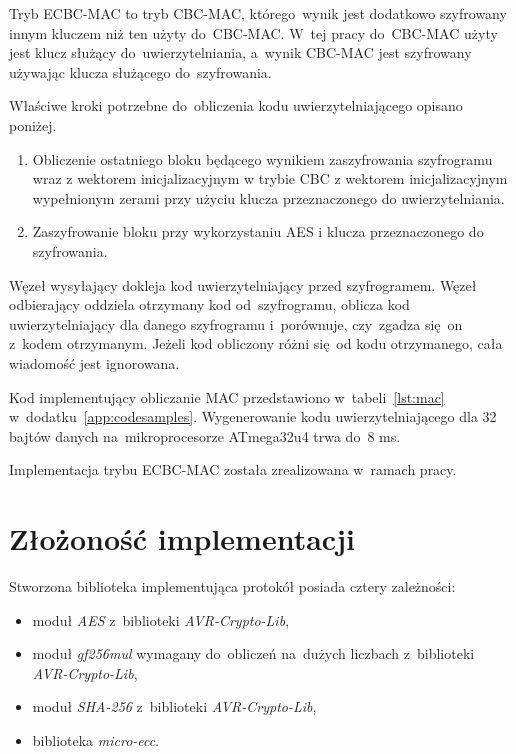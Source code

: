 Tryb ECBC-MAC to tryb CBC-MAC, którego~wynik jest dodatkowo szyfrowany innym kluczem niż ten użyty do~CBC-MAC. W~tej pracy do~CBC-MAC użyty jest klucz służący do~uwierzytelniania, a~wynik CBC-MAC jest szyfrowany używając klucza służącego do~szyfrowania.

Właściwe kroki potrzebne do~obliczenia kodu uwierzytelniającego opisano poniżej.

\begin{enumerate}
\item Obliczenie ostatniego bloku będącego wynikiem zaszyfrowania szyfrogramu wraz z wektorem inicjalizacyjnym w trybie CBC z wektorem inicjalizacyjnym wypełnionym zerami przy użyciu klucza przeznaczonego do uwierzytelniania.
\item Zaszyfrowanie bloku przy wykorzystaniu AES i klucza przeznaczonego do szyfrowania.
\end{enumerate}

Węzeł wysyłający dokleja kod uwierzytelniający przed szyfrogramem. Węzeł odbierający oddziela otrzymany kod od~szyfrogramu, oblicza kod uwierzytelniający dla danego szyfrogramu i~porównuje, czy~zgadza się on z~kodem otrzymanym. Jeżeli kod obliczony różni się od kodu otrzymanego, cała wiadomość jest ignorowana.

Kod implementujący obliczanie MAC przedstawiono w~tabeli~\ref{lst:mac} w~dodatku~\ref{app:codesamples}. Wygenerowanie kodu uwierzytelniającego dla 32 bajtów danych na~mikroprocesorze ATmega32u4 trwa do~8 ms.

Implementacja trybu ECBC-MAC została zrealizowana w~ramach pracy.

\section{Złożoność implementacji}
\label{cha:complexity}

\FloatBarrier

Stworzona biblioteka implementująca protokół posiada cztery zależności:

\begin{itemize}
    \item moduł \emph{AES} z~biblioteki \emph{AVR-Crypto-Lib},
    \item moduł \emph{gf256mul} wymagany do~obliczeń na~dużych liczbach z~biblioteki \emph{AVR-Crypto-Lib},
    \item moduł \emph{SHA-256} z~biblioteki \emph{AVR-Crypto-Lib},
    \item biblioteka \emph{micro-ecc}.
\end{itemize}

